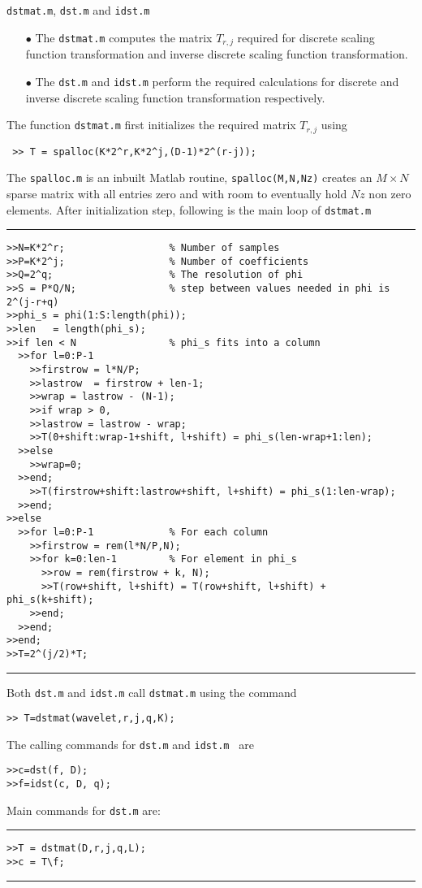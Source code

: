 \documentclass[acmtoms]{acmtrans2m}
\begin{document}
 \section{} {\tt dstmat.m}, {\tt dst.m} and {\tt idst.m} 
\begin{itemize}
\item[$\bullet$] The {\tt dstmat.m} computes the matrix $T_{r,j}$ required for discrete scaling function transformation and inverse discrete scaling function transformation.
\item[$\bullet$] The {\tt dst.m} and {\tt idst.m} perform the required calculations for discrete
and inverse discrete scaling function transformation respectively.
\end{itemize}
 The function {\tt dstmat.m} first initializes the required
matrix $T_{r,j}$ using
\begin{verbatim}
 >> T = spalloc(K*2^r,K*2^j,(D-1)*2^(r-j));
\end{verbatim}
The {\tt spalloc.m} is an inbuilt Matlab routine, {\tt spalloc(M,N,Nz)} creates an $M \times N$ sparse matrix with  all entries zero and with room to eventually hold $Nz$ non zero elements. After initialization step, following is the main loop of {\tt dstmat.m}
\\\hrule
\begin{verbatim}
>>N=K*2^r;                  % Number of samples
>>P=K*2^j;                  % Number of coefficients
>>Q=2^q;                    % The resolution of phi
>>S = P*Q/N;                % step between values needed in phi is 2^(j-r+q)
>>phi_s = phi(1:S:length(phi));
>>len   = length(phi_s);
>>if len < N                % phi_s fits into a column
  >>for l=0:P-1
    >>firstrow = l*N/P;
    >>lastrow  = firstrow + len-1;
    >>wrap = lastrow - (N-1);
    >>if wrap > 0,
    >>lastrow = lastrow - wrap;
    >>T(0+shift:wrap-1+shift, l+shift) = phi_s(len-wrap+1:len);
  >>else
    >>wrap=0;
  >>end;
    >>T(firstrow+shift:lastrow+shift, l+shift) = phi_s(1:len-wrap);
  >>end;
>>else
  >>for l=0:P-1             % For each column
    >>firstrow = rem(l*N/P,N);
    >>for k=0:len-1         % For element in phi_s
      >>row = rem(firstrow + k, N);
      >>T(row+shift, l+shift) = T(row+shift, l+shift) + phi_s(k+shift);
    >>end;
  >>end;
>>end;
>>T=2^(j/2)*T;
\end{verbatim}
\hrule \vspace{.5cm} 
Both \verb#dst.m# and \verb#idst.m# call \verb#dstmat.m# using the command
\begin{verbatim}
>> T=dstmat(wavelet,r,j,q,K);
\end{verbatim}
 The calling
commands for \verb#dst.m# and \verb#idst.m # are
\begin{verbatim}
>>c=dst(f, D);
>>f=idst(c, D, q);
\end{verbatim}
Main commands for \verb#dst.m# are:
\\
\hrule
\begin{verbatim}
>>T = dstmat(D,r,j,q,L);
>>c = T\f;
\end{verbatim}
\hrule
\vspace{.5cm}
\end{document}
